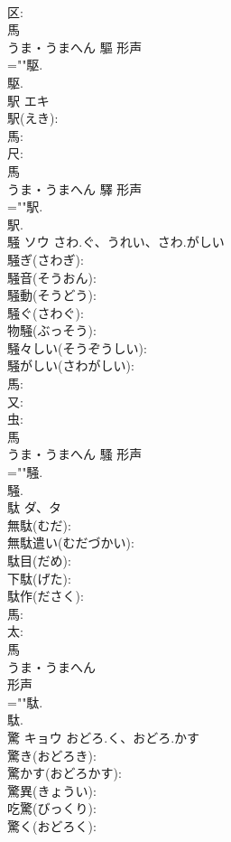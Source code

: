 \documentclass[8pt]{extreport}
\begin{document}
\begin{CJK}{UTF8}{min}
\\	区: 
\\	馬	
\\	うま・うまへん	驅	形声 
\\	=""駆.
\\	駆.
\\	駅	エキ			
\\	駅(えき): 
\\	馬: 
\\	尺: 
\\	馬	
\\	うま・うまへん	驛	形声 
\\	=""駅.
\\	駅.
\\	騒	ソウ	さわ.ぐ、うれい、さわ.がしい		
\\	騒ぎ(さわぎ): 
\\	騒音(そうおん): 
\\	騒動(そうどう): 
\\	騒ぐ(さわぐ): 
\\	物騒(ぶっそう): 
\\	騒々しい(そうぞうしい): 
\\	騒がしい(さわがしい): 
\\	馬: 
\\	又: 
\\	虫: 
\\	馬	
\\	うま・うまへん	騷	形声 
\\	=""騒.
\\	騒.
\\	駄	ダ、タ			
\\	無駄(むだ): 
\\	無駄遣い(むだづかい): 
\\	駄目(だめ): 
\\	下駄(げた): 
\\	駄作(ださく): 
\\	馬: 
\\	太: 
\\	馬	
\\	うま・うまへん	
\\	形声 
\\	=""駄.
\\	駄.
\\	驚	キョウ	おどろ.く、おどろ.かす		
\\	驚き(おどろき): 
\\	驚かす(おどろかす): 
\\	驚異(きょうい): 
\\	吃驚(びっくり): 
\\	驚く(おどろく): 

\end{CJK}
\end{document}
